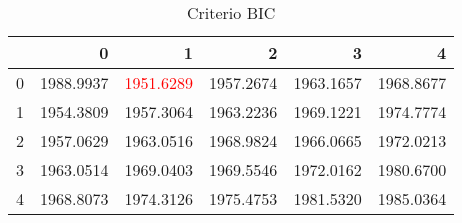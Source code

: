 \begin{table}[H]
\label{tab:autoarima_bic}
\centering
\begin{tabular}{lrrrrr}
\toprule
 & 0 & 1 & 2 & 3 & 4 \\
\midrule
0 & 1988.9937 & \textcolor{red}{1951.6289} & 1957.2674 & 1963.1657 & 1968.8677 \\
1 & 1954.3809 & 1957.3064 & 1963.2236 & 1969.1221 & 1974.7774 \\
2 & 1957.0629 & 1963.0516 & 1968.9824 & 1966.0665 & 1972.0213 \\
3 & 1963.0514 & 1969.0403 & 1969.5546 & 1972.0162 & 1980.6700 \\
4 & 1968.8073 & 1974.3126 & 1975.4753 & 1981.5320 & 1985.0364 \\
\bottomrule
\end{tabular}
\caption{Criterio BIC}
\end{table}
